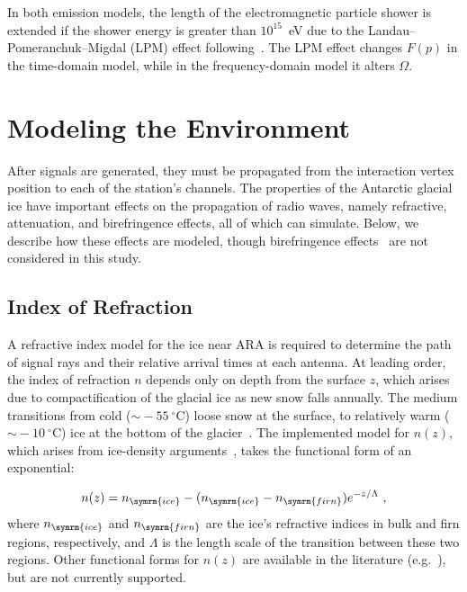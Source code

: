             In both emission models, the length of the electromagnetic particle shower is extended
            if the shower energy is greater than $10^{15}$~eV due to the Landau–Pomeranchuk–Migdal (LPM) effect following~\citep{lpm_modeling}.
            The LPM effect changes $F(p)$ in the time-domain model, while in the frequency-domain model it alters $\Omega$.
            
        
    \section{Modeling the Environment}

        After signals are generated, they must be propagated from the interaction vertex position to each of the station's channels.
        The properties of the Antarctic glacial ice have important effects on the propagation of radio waves, namely refractive, attenuation, and birefringence effects, all of which \arasim{} can simulate.
        Below, we describe how these effects are modeled, though birefringence effects~\citep{birefringence,ara_birefringence} are not considered in this study.
    
        \subsection{Index of Refraction}
            A refractive index model for the ice near ARA is required to determine the path of signal rays and their relative arrival times at each antenna.
            At leading order, the index of refraction $n$ depends only on depth from the surface $z$, which arises due to compactification
            of the glacial ice as new snow falls annually.
            The medium transitions from cold ($\sim \! -55~^\circ$C) loose snow at the surface, to relatively warm ($\sim \! -10~^\circ$C) ice at the bottom of the glacier~\citep{ice_temperature}.
            The implemented model for $n(z)$, which arises from ice-density arguments~\citep{ice_density}, takes the functional form
            of an exponential:

            \begin{align}
                n(z) = n_{\symrm{ice}} - (n_{\symrm{ice}}-n_{\symrm{firn}}) e^{-z/\Lambda}~,
            \end{align}
            where $n_{\symrm{ice}}$ and $n_{\symrm{firn}}$ are the ice's refractive indices in bulk and firn regions, respectively, and $\Lambda$ is the length scale of the transition between these two regions.
            Other functional forms for $n(z)$ are available in the literature (e.g.~\citep{ice_ara}), but are not currently supported.

